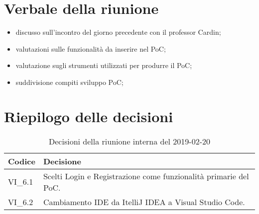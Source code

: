 \section{Verbale della riunione}
\begin{itemize}
	\item discusso sull'incontro del giorno precedente con il professor Cardin;
	\item valutazioni sulle funzionalità da inserire nel PoC;
	\item valutazione sugli strumenti utilizzati per produrre il PoC;
	\item suddivisione compiti sviluppo PoC;
\end{itemize}

\hspace{3cm}

\section{Riepilogo delle decisioni}

	
	\begin{longtable}{ >{\centering}p{} >{}p{}}
		\caption{Decisioni della riunione interna del 2019-02-20}\\	
		\rowcolorhead
		\textbf{\color{white}Codice} 
		& \centering\textbf{\color{white}Decisione} 
		\tabularnewline 
		\endfirsthead
		VI\_6.1 & Scelti Login e Registrazione come funzionalità primarie del 
		PoC.
		
		\tabularnewline 
		VI\_6.2 & Cambiamento IDE da ItelliJ IDEA a Visual Studio 
		Code.
		
		
		
		
	\end{longtable}
	




